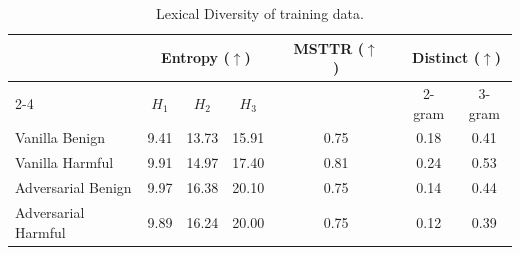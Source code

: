 \begin{table}[t]
\caption{Lexical Diversity of \dataset training data.}
\label{tab:appx-training-diversity}
\centering
\renewcommand{\arraystretch}{1.4}
\setlength\tabcolsep{5pt}
\begin{tabular}{lcccccccc}
\hline
                    & \multicolumn{3}{c}{\textbf{Entropy} ($\uparrow$)} &  & \multirow{2}{*}{\textbf{MSTTR} ($\uparrow$)} &  & \multicolumn{2}{c}{\textbf{Distinct} ($\uparrow$)} \\ \cline{2-4} \cline{8-9} 
                    & $H_1$           & $H_2$             & $H_3$             &  &                                                  &  & 2-gram        & 3-gram       \\ \hline
Vanilla Benign      & 9.41            & 13.73            & 15.91            &  & 0.75                                             &  & 0.18          & 0.41         \\
Vanilla Harmful     & 9.91            & 14.97            & 17.40            &  & 0.81                                             &  & 0.24          & 0.53         \\ \hline
Adversarial Benign  & 9.97            & 16.38            & 20.10            &  & 0.75                                             &  & 0.14          & 0.44         \\
Adversarial Harmful & 9.89            & 16.24            & 20.00           &  & 0.75                                             &  & 0.12          & 0.39         \\ \hline
\end{tabular}
\end{table}